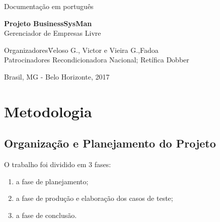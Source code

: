 \documentclass[a4paper,12pt]{article}
\newcommand{\thecompany}{\huge Documentação em português}
\newcommand{\thelogo}{\begin{figure}[H] \centering \texttt{[image: BRASAOUFV.jpg]} \end{figure}}
\newcommand{\thedate}{\today}
\newcommand{\thetitle}{\textbf{\LARGE  Projeto BusinessSysMan} \\ \large{Gerenciador de Empresas Livre}}
\newcommand{\theauthor}{Veloso G., Victor e Vieira G.,Fadoa}
\begin{document}
	
	\begin{titlepage}
		\begin{center}
			\thecompany
			
			
			\vspace{10pt}
			
			
			\vspace{60pt}
			
			\thetitle
			
			\vspace{160pt}
			
		\end{center}
		
		\begin{flushleft}
			\begin{tabbing}
				Organizadores\qquad\qquad\= \theauthor \\
				Patrocinadores\> Recondicionadora Nacional; Retífica Dobber\\
				
			\end{tabbing}
			
		\end{flushleft}
		
		\begin{center}
			\vspace{\fill}
			Brasil, MG - Belo Horizonte, 2017%
		\end{center}
	\end{titlepage}
	\tableofcontents
	\thispagestyle{empty}
	\clearpage
	\setcounter{page}{1}
	\begin{abstract}
	Este projeto tem o intuito de facilitar a administração financeira e de funcionários de pequenas, médias e grande Empresas sem nenhum custo e com total liberdade de alteração e distribuição. Inicialmente baseada na framework multiplataformas e multiarquiteturas Qt, buscamos o máximo de acessibilidade e compatibilidade com a menor curva de aprendizado e adaptação para que a consulta aos dados seja um possibilidade a todos. Todos arquivos estão disponibilizados em um \href{https://github.com/primary157/TP1AEDS1.git}{repositório do GitHub} com cada etapa do processo de criação. 
	\end{abstract}
	\section{Metodologia}
	
		\subsection{Organização e Planejamento do Projeto}
			O trabalho foi dividido em 3 fases: 
			\begin{enumerate}
				\item a fase de planejamento;
				\item a fase de produção e elaboração dos casos de teste;
				\item a fase de conclusão.
			\end{enumerate}
\end{document}
